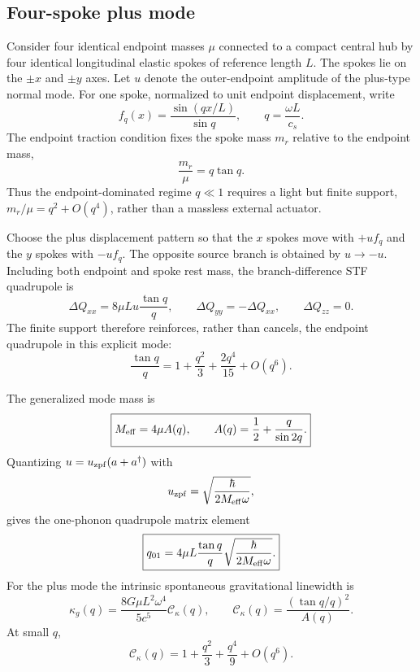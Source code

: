 \documentclass[11pt]{article}
\begin{document}
\subsection{Four-spoke plus mode}

Consider four identical endpoint masses $\mu$ connected to a compact central hub by four identical longitudinal elastic spokes of reference length $L$. The spokes lie on the $\pm x$ and $\pm y$ axes. Let $u$ denote the outer-endpoint amplitude of the plus-type normal mode. For one spoke, normalized to unit endpoint displacement, write
\begin{equation}
 f_q(x)=\frac{\sin(qx/L)}{\sin q},
\qquad
q=\frac{\omega L}{c_s}.
\end{equation}
The endpoint traction condition fixes the spoke mass $m_r$ relative to the endpoint mass,
\begin{equation}
\boxed{
\frac{m_r}{\mu}=q\tan q.
}
\label{eq:spoke-mass}
\end{equation}
Thus the endpoint-dominated regime $q\ll1$ requires a light but finite support, $m_r/\mu=q^2+O(q^4)$, rather than a massless external actuator.

Choose the plus displacement pattern so that the $x$ spokes move with $+u f_q$ and the $y$ spokes with $-u f_q$. The opposite source branch is obtained by $u\to-u$. Including both endpoint and spoke rest mass, the branch-difference STF quadrupole is
\begin{equation}
\boxed{
\Delta Q_{xx}
=8\mu Lu\frac{\tan q}{q},
\qquad
\Delta Q_{yy}=-\Delta Q_{xx},
\qquad
\Delta Q_{zz}=0.
}
\label{eq:finite-spoke-Q}
\end{equation}
The finite support therefore reinforces, rather than cancels, the endpoint quadrupole in this explicit mode:
\begin{equation}
\frac{\tan q}{q}
=1+\frac{q^2}{3}+\frac{2q^4}{15}+O(q^6).
\end{equation}

The generalized mode mass is
\begin{equation}
\boxed{
M_{\rm eff}=4\mu A(q),
\qquad
A(q)=\frac12+\frac{q}{\sin 2q}.
}
\label{eq:Meff}
\end{equation}
Quantizing $u=u_{\rm zpf}(a+a^\dagger)$ with
\begin{equation}
 u_{\rm zpf}=\sqrt{\frac{\hbar}{2M_{\rm eff}\omega}},
\end{equation}
gives the one-phonon quadrupole matrix element
\begin{equation}
\boxed{
q_{01}
=4\mu L\frac{\tan q}{q}
\sqrt{\frac{\hbar}{2M_{\rm eff}\omega}}.
}
\label{eq:q01}
\end{equation}
For the plus mode the intrinsic spontaneous gravitational linewidth is
\begin{equation}
\boxed{
\kappa_g(q)
=\frac{8G\mu L^2\omega^4}{5c^5}
\mathcal C_\kappa(q),
\qquad
\mathcal C_\kappa(q)=
\frac{(\tan q/q)^2}{A(q)}.
}
\label{eq:kappag}
\end{equation}
At small $q$,
\begin{equation}
\mathcal C_\kappa(q)
=1+\frac{q^2}{3}+\frac{q^4}{9}+O(q^6).
\end{equation}
\end{document}
